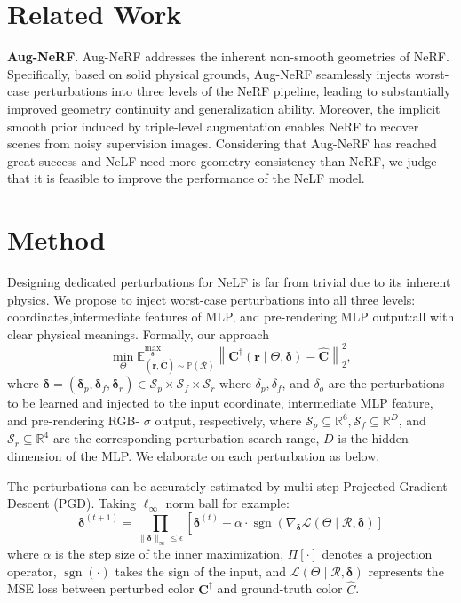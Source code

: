 \documentclass[10pt,twocolumn,letterpaper]{article}
\begin{document}
\section{Related Work}
\label{sec:formatting}
\textbf{Aug-NeRF}. Aug-NeRF addresses the inherent non-smooth geometries of NeRF. Specifically, based on solid physical grounds, Aug-NeRF seamlessly injects worst-case perturbations into three levels of the NeRF pipeline, leading to substantially improved geometry continuity and generalization ability. Moreover, the implicit smooth prior induced by triple-level augmentation enables NeRF to recover scenes from noisy supervision images. Considering that Aug-NeRF has reached great success and NeLF need more geometry consistency than NeRF, we judge that it is feasible to improve the performance of the NeLF model.

\section{Method}
Designing dedicated perturbations for NeLF is far from trivial due to its inherent physics. We propose to inject worst-case perturbations into all three levels:  coordinates,intermediate features of MLP, and pre-rendering MLP output:all with clear physical meanings.  Formally, our approach
$$
\min _{\Theta} \mathbb{E}_{(\boldsymbol{r}, \widehat{\boldsymbol{C}}) \sim \mathbb{P}(\mathcal{R})}^{\max _{\boldsymbol{\delta}}}\left\|\boldsymbol{C}^{\dagger}(\boldsymbol{r} \mid \Theta, \boldsymbol{\delta})-\widehat{\boldsymbol{C}}\right\|_2^2,
$$
where $\boldsymbol{\delta}=\left(\boldsymbol{\delta}_p, \boldsymbol{\delta}_f, \boldsymbol{\delta}_r\right) \in \mathcal{S}_p \times \mathcal{S}_f \times \mathcal{S}_r$
where $\delta_p, \delta_f$, and $\delta_o$ are the perturbations to be learned and injected to the input coordinate, intermediate MLP feature, and pre-rendering RGB- $\sigma$ output, respectively, where $\mathcal{S}_p \subseteq \mathbb{R}^6, \mathcal{S}_f \subseteq \mathbb{R}^D$, and $\mathcal{S}_r \subseteq \mathbb{R}^4$ are the corresponding perturbation search range, $D$ is the hidden dimension of the MLP. We elaborate on each perturbation as below.

The perturbations can be accurately estimated by multi-step Projected Gradient Descent (PGD). Taking $\ell_{\infty}$ norm ball for example:
$$
\boldsymbol{\delta}^{(t+1)}=\prod_{\|\boldsymbol{\delta}\|_{\infty} \leq \epsilon}\left[\boldsymbol{\delta}^{(t)}+\alpha \cdot \operatorname{sgn}\left(\nabla_{\boldsymbol{\delta}} \mathcal{L}(\Theta \mid \mathcal{R}, \boldsymbol{\delta})\right]\right.
$$
where $\alpha$ is the step size of the inner maximization, $\Pi[\cdot]$ denotes a projection operator, $\operatorname{sgn}(\cdot)$ takes the sign of the input, and $\mathcal{L}(\Theta \mid \mathcal{R}, \boldsymbol{\delta})$ represents the MSE loss between perturbed color $\boldsymbol{C}^{\dagger}$ and ground-truth color $\widehat{C}$.
{\small


}
\end{document}

